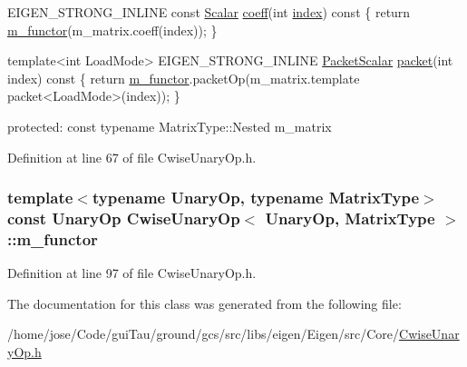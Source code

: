 \begin{DoxyCode}
    EIGEN\_STRONG\_INLINE \textcolor{keyword}{const} \hyperlink{class_matrix_base_a625df8339dc2d816cbc0fd66e7dadaf5}{Scalar} \hyperlink{class_matrix_base_ab256cf86336c19de77024a6dd0f9cef0}{coeff}(\textcolor{keywordtype}{int} \hyperlink{glext_8h_ab47dd9958bcadea08866b42bf358e95e}{index})\textcolor{keyword}{ const}
\textcolor{keyword}{    }\{
      \textcolor{keywordflow}{return} \hyperlink{class_cwise_unary_op_ac8582aef8496b60bfb945e9a68c8f7e1}{m\_functor}(m\_matrix.coeff(index));
    \}

    \textcolor{keyword}{template}<\textcolor{keywordtype}{int} LoadMode>
    EIGEN\_STRONG\_INLINE \hyperlink{class_matrix_base_a58f32cd6a06433ee7a60efa03e99183a}{PacketScalar} \hyperlink{class_matrix_base_ad8953cad178367ffaa242e10436f952a}{packet}(\textcolor{keywordtype}{int} index)\textcolor{keyword}{ const}
\textcolor{keyword}{    }\{
      \textcolor{keywordflow}{return} \hyperlink{class_cwise_unary_op_ac8582aef8496b60bfb945e9a68c8f7e1}{m\_functor}.packetOp(m\_matrix.template packet<LoadMode>(index));
    \}

  \textcolor{keyword}{protected}:
    \textcolor{keyword}{const} \textcolor{keyword}{typename} MatrixType::Nested m\_matrix
\end{DoxyCode}


Definition at line 67 of file Cwise\-Unary\-Op.\-h.

\hypertarget{class_cwise_unary_op_ac8582aef8496b60bfb945e9a68c8f7e1}{
\subsubsection[{m\-\_\-functor}]{\setlength{\rightskip}{0pt plus 5cm}template$<$typename Unary\-Op, typename Matrix\-Type$>$ const Unary\-Op {\bf Cwise\-Unary\-Op}$<$ Unary\-Op, Matrix\-Type $>$\-::m\-\_\-functor}}\label{class_cwise_unary_op_ac8582aef8496b60bfb945e9a68c8f7e1}


Definition at line 97 of file Cwise\-Unary\-Op.\-h.



The documentation for this class was generated from the following file\-:\begin{DoxyCompactItemize}
\item 
/home/jose/\-Code/gui\-Tau/ground/gcs/src/libs/eigen/\-Eigen/src/\-Core/\hyperlink{_cwise_unary_op_8h}{Cwise\-Unary\-Op.\-h}\end{DoxyCompactItemize}
